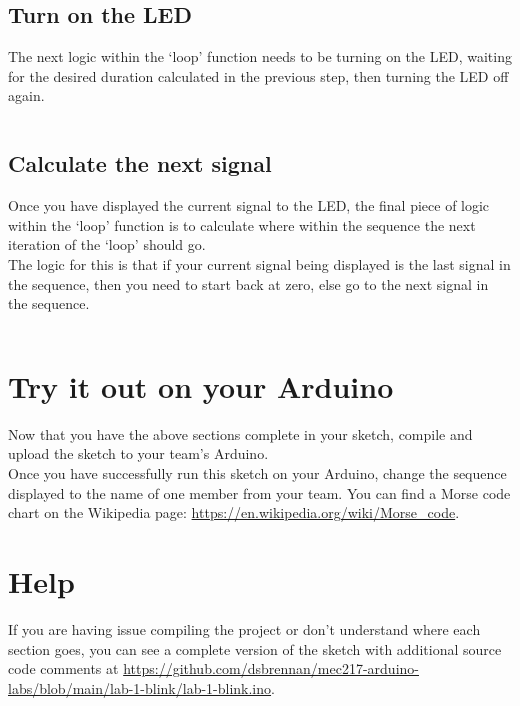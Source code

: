 \documentclass[11pt,a4paper]{article}
\begin{document}
\inputminted{arduino}{./src/3-calculate-duration.txt}

\subsection{Turn on the LED}
\label{sec:led}
The next logic within the `loop' function needs to be turning on the LED, waiting for the desired duration calculated in the previous step, then turning the LED off again.

\inputminted{arduino}{./src/4-flash-led.txt}

\subsection{Calculate the next signal}
\label{sec:next}
Once you have displayed the current signal to the LED, the final piece of logic within the `loop' function is to calculate where within the sequence the next iteration of the `loop' should go.\\

\noindent
The logic for this is that if your current signal being displayed is the last signal in the sequence, then you need to start back at zero, else go to the next signal in the sequence.

\inputminted{arduino}{./src/5-next-sequence.txt}

\section{Try it out on your Arduino}
Now that you have the above sections complete in your sketch, compile and upload the sketch to your team's Arduino.\\ 

\noindent
Once you have successfully run this sketch on your Arduino, change the sequence displayed to the name of one member from your team. You can find a Morse code chart on the Wikipedia page: \url{https://en.wikipedia.org/wiki/Morse_code}.

\section*{Help}
If you are having issue compiling the project or don't understand where each section goes, you can see a complete version of the sketch with additional source code comments at \url{https://github.com/dsbrennan/mec217-arduino-labs/blob/main/lab-1-blink/lab-1-blink.ino}.

\vspace{2em}

\begin{center}
\end{center}
\end{document}
